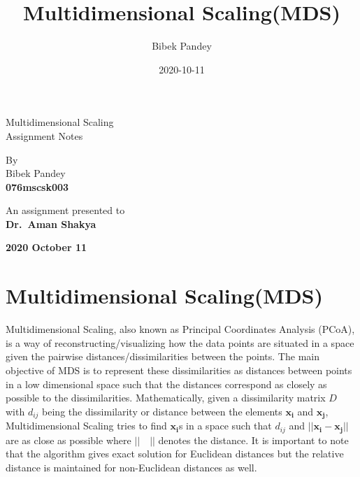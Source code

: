 \documentclass[12pt]{article}
\title{Multidimensional Scaling(MDS)}
\date{2020-10-11}
\author{Bibek Pandey}
\newcommand{\vect}[1]{\boldsymbol{#1}}
\begin{document}
\begin{titlepage}
   \begin{center}
       \vspace*{1cm}

       {\huge Multidimensional Scaling} \\
       \vspace{0.5cm}
       Assignment Notes

       \vfill

       By \\
       \vspace{0.5cm}
       Bibek Pandey \\
       \textbf{076mscsk003}
       \vspace{1.5cm}

       \vfill

       An assignment presented to \\
       \vspace{0.3cm}
       \textbf{Dr.\ Aman Shakya}

       \vspace{1.5cm}
       \textbf{2020 October 11}

   \end{center}
\end{titlepage}

\section*{Multidimensional Scaling(MDS)}
Multidimensional Scaling, also known as Principal Coordinates Analysis (PCoA),
is a way of reconstructing/visualizing how the data points are situated in a
space given the pairwise distances/dissimilarities between the points.
The main objective of MDS is to represent these dissimilarities as distances
between points in a low dimensional space such that the distances correspond as
closely as possible to the dissimilarities.
\newline \newline
Mathematically, given a dissimilarity matrix $D$ with $d_{ij}$ being the
dissimilarity or distance between the elements $\vect{x_i}$ and $\vect{x_j}$,
Multidimensional Scaling tries to find $\vect{x_i}$s in a space such that
$d_{ij}$ and  $||\vect{x_i} - \vect{x_j}||$ are as
close as possible where $||\quad||$ denotes the distance.
\newline \newline
It is important to note that the algorithm gives exact solution for Euclidean
distances but the relative distance is maintained for non-Euclidean distances
as well.
\end{document}
